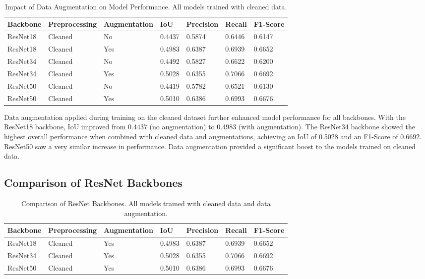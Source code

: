 \documentclass{article}
\begin{document}
\begin{table}[htbp] %
  \caption{Impact of Data Augmentation on Model Performance. All models trained with cleaned data.}
  \label{table:augmentation_impact}
  \centering
  \begin{tabular}{lllllll}
    \toprule
    Backbone & Preprocessing & Augmentation & IoU    & Precision & Recall & F1-Score \\
    \midrule
    ResNet18 & Cleaned       & No           & 0.4437 & 0.5874    & 0.6446 & 0.6147   \\
    ResNet18 & Cleaned       & Yes          & 0.4983 & 0.6387    & 0.6939 & 0.6652   \\
    ResNet34 & Cleaned       & No           & 0.4492 & 0.5827    & 0.6622 & 0.6200   \\
    ResNet34 & Cleaned       & Yes          & 0.5028 & 0.6355    & 0.7066 & 0.6692   \\
    ResNet50 & Cleaned       & No           & 0.4419 & 0.5782    & 0.6521 & 0.6130   \\
    ResNet50 & Cleaned       & Yes          & 0.5010 & 0.6386    & 0.6993 & 0.6676   \\
    \bottomrule
  \end{tabular}
\end{table}

Data augmentation applied during training on the cleaned dataset further enhanced model performance for all backbones. With the ResNet18 backbone, IoU improved from 0.4437 (no augmentation) to 0.4983 (with augmentation). The ResNet34 backbone showed the highest overall performance when combined with cleaned data and augmentations, achieving an IoU of 0.5028 and an F1-Score of 0.6692. ResNet50 saw a very similar increase in performance. Data augmentation provided a significant boost to the models trained on cleaned data.



\subsection{Comparison of ResNet Backbones} %

\begin{table}[htbp] %
  \caption{Comparison of ResNet Backbones. All models trained with cleaned data and data augmentation.}
  \label{table:backbone_comparison}
  \centering
  \begin{tabular}{lllllll}
    \toprule
    Backbone & Preprocessing & Augmentation & IoU    & Precision & Recall & F1-Score \\
    \midrule
    ResNet18 & Cleaned       & Yes          & 0.4983 & 0.6387    & 0.6939 & 0.6652   \\
    ResNet34 & Cleaned       & Yes          & 0.5028 & 0.6355    & 0.7066 & 0.6692   \\
    ResNet50 & Cleaned       & Yes          & 0.5010 & 0.6386    & 0.6993 & 0.6676   \\
    \bottomrule
  \end{tabular}
\end{table}
\end{document}
